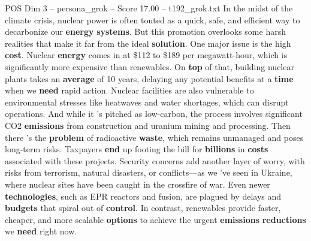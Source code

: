 \begin{textsample}{POS Dim 3 – persona\_grok – Score 17.00 – t192\_grok.txt}  \label{ex:f3_pos_039}
In the midst of the climate crisis, nuclear power is often touted as a quick, safe, and efficient way to decarbonize our \textbf{energy} \textbf{systems}.
But this promotion overlooks some harsh realities that make it far from the ideal \textbf{solution}.
One major issue is the high \textbf{cost}.
Nuclear \textbf{energy} comes in at \$112 to \$189 per megawatt-hour, which is significantly more expensive than renewables.
On \textbf{top} of that, building nuclear plants takes an \textbf{average} of 10 years, delaying any potential benefits at a \textbf{time} when we \textbf{need} rapid action.
Nuclear facilities are also vulnerable to environmental stresses like heatwaves and water shortages, which can disrupt operations.
And while it 's pitched as low-carbon, the process involves significant CO2 \textbf{emissions} from construction and uranium mining and processing.
Then there 's the \textbf{problem} of radioactive \textbf{waste}, which remains unmanaged and poses long-term risks.
Taxpayers \textbf{end} up footing the bill for \textbf{billions} in \textbf{costs} associated with these projects.
Security concerns add another layer of worry, with risks from terrorism, natural disasters, or conflicts—as we 've seen in Ukraine, where nuclear sites have been caught in the crossfire of war.
Even newer \textbf{technologies}, such as EPR reactors and fusion, are plagued by delays and \textbf{budgets} that spiral out of \textbf{control}.
In contrast, renewables provide faster, cheaper, and more scalable \textbf{options} to achieve the urgent \textbf{emissions} \textbf{reductions} we \textbf{need} right now.

\end{textsample}
